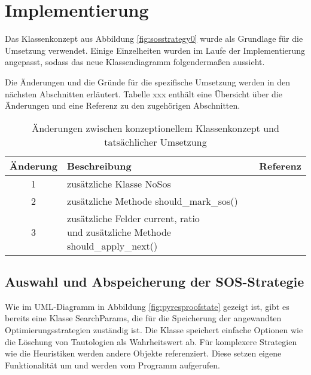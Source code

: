 
\chapter{Implementierung}

Das Klassenkonzept aus Abbildung \ref{fig:sosstrategy0} wurde als Grundlage für die Umsetzung verwendet. Einige Einzelheiten wurden im Laufe der Implementierung angepasst, sodass das neue Klassendiagramm folgendermaßen aussieht.



Die Änderungen und die Gründe für die spezifische Umsetzung werden in den nächsten Abschnitten erläutert. Tabelle xxx enthält eine Übersicht über die Änderungen und eine Referenz zu den zugehörigen Abschnitten.
\begin{table}[h]
	\centering
	\begin{tabular}{|c|l|c|}
		\hline
		Änderung & Beschreibung & Referenz \\
		\hline
		1 & zusätzliche Klasse NoSos &  \\
		\hline
		2 & zusätzliche Methode should\_mark\_sos() &  \\
		\hline
		3 & \cellbreak{l}{zusätzliche Felder current, ratio \\ und zusätzliche Methode should\_apply\_next()} &  \\
		\hline
	\end{tabular}
	\caption{Änderungen zwischen konzeptionellem Klassenkonzept und tatsächlicher Umsetzung}
	\label{table:difference_sos_classes}
\end{table}

\section{Auswahl und Abspeicherung der SOS-Strategie}

Wie im UML-Diagramm in Abbildung \ref{fig:pyresproofstate} gezeigt ist, gibt es bereits eine Klasse
SearchParams, die für die Speicherung der angewandten Optimierungsstrategien zuständig ist. Die Klasse speichert einfache Optionen wie die Löschung von Tautologien als Wahrheitswert ab. Für komplexere Strategien wie die Heuristiken werden andere Objekte referenziert. Diese setzen eigene Funktionalität um und werden vom Programm aufgerufen.

